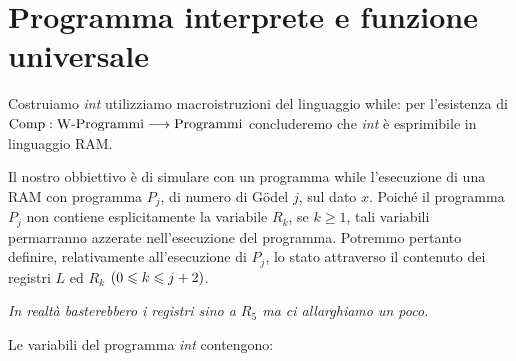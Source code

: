 \documentclass{lectures}
\begin{document}
\section{Programma interprete e funzione universale}
\begin{definition}[Interprete]
    Costruiamo \textit{int} utilizziamo macroistruzioni del linguaggio while: per l'esistenza di \(\text{Comp}:\text{W-Programmi}\longrightarrow \text{Programmi}\) concluderemo che \textit{int} è esprimibile in linguaggio RAM.
    \begin{multicols}{2}
        Il nostro obbiettivo è di simulare con un programma while l'esecuzione di una RAM con programma \(P_j\), di numero di Gödel \(j\), sul dato \(x\). Poiché il programma \(P_j\) non contiene esplicitamente la variabile \(R_k\), se \(k\geq 1\), tali variabili permarranno azzerate nell'esecuzione del programma. Potremmo pertanto definire, relativamente all'esecuzione di \(P_j\), lo stato attraverso il contenuto dei registri \(L\) ed \(R_k\) \(\left(0\leqslant k \leqslant j+2\right)\).
        
        \textit{In realtà basterebbero i registri sino a \(R_5\) ma ci allarghiamo un poco.}
        
        Le variabili del programma \textit{int} contengono:
        

\end{multicols}
\end{definition}
\end{document}
